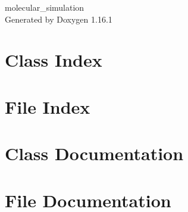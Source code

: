 \documentclass[twoside]{book}
\newcommand{\+}{\discretionary{\mbox{\scriptsize$\hookleftarrow$}}{}{}}
\newcommand{\clearemptydoublepage}{%
    \newpage{\pagestyle{empty}\cleardoublepage}%
  }
\begin{document}
  \raggedbottom
    \hypersetup{pageanchor=false,
                bookmarksnumbered=true,
                pdfencoding=unicode
               }
  \begin{titlepage}
  \vspace*{7cm}
  \begin{center}%
  {\Large molecular\+\_\+simulation}\\
  \vspace*{1cm}
  {\large Generated by Doxygen 1.16.1}\\
  \end{center}
  \end{titlepage}
  \clearemptydoublepage
  \tableofcontents
  \clearemptydoublepage
  \hypersetup{pageanchor=true}
\chapter{Class Index}

\chapter{File Index}

\chapter{Class Documentation}



\chapter{File Documentation}


  \backmatter
  \newpage
  \clearemptydoublepage
  \printindex
\end{document}
